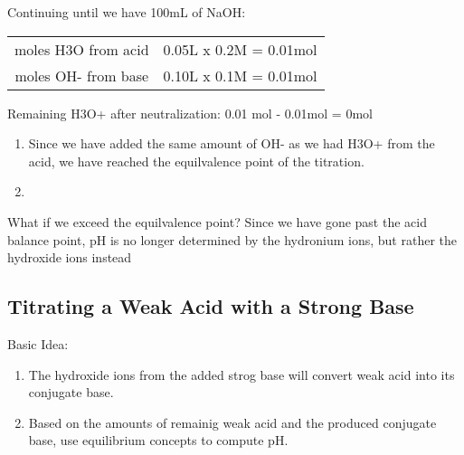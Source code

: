 \documentclass[../CHEM152Notes.tex]{subfiles}
\begin{document}
Continuing until we have 100mL of NaOH:
\newline
\begin{tabular}{ c c }
    moles H3O from acid & 0.05L x 0.2M = 0.01mol \\
    moles OH- from base & 0.10L x 0.1M = 0.01mol \\
\end{tabular}
\newline
Remaining H3O+ after neutralization: 0.01 mol - 0.01mol = 0mol \\
\begin{enumerate}
    \item Since we have added the same amount of OH- as we had H3O+ from the acid, we have reached the equilvalence point of the titration.
    \item 
\end{enumerate}

What if we exceed the equilvalence point? 
\newline
Since we have gone past the acid balance point, pH is no longer determined by the hydronium ions, but rather the hydroxide ions instead

\subsection*{Titrating a Weak Acid with a Strong Base}
Basic Idea:
\begin{enumerate}
    \item The hydroxide ions from the added strog base will convert weak acid into its conjugate base.
    \item Based on the amounts of remainig weak acid and the produced conjugate base, use equilibrium concepts to compute pH.
\end{enumerate}
\end{document}
